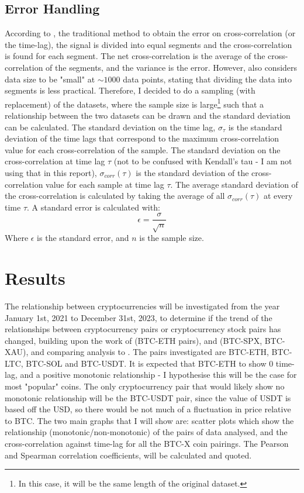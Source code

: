 \documentclass[a4paper, 10pt, conference]{ieeeconf}      %
\begin{document}
\subsection{Error Handling}
According to \cite{Misra2018}, the traditional method to obtain the error on cross-correlation (or the time-lag), the signal is divided into equal segments and the cross-correlation is found for each segment. The net cross-correlation is the average of the cross-correlation of the segments, and the variance is the error. However, \cite{Misra2018} also considers data size to be "small" at $\sim1000$ data points, stating that dividing the data into segments is less practical. Therefore, I decided to do a sampling (with replacement) of the datasets, where the sample size is large\footnote{In this case, it will be the same length of the original dataset.} such that a relationship between the two datasets can be drawn \cite{Kose2023} and the standard deviation can be calculated. The standard deviation on the time lag, $\sigma_\tau$ is the standard deviation of the time lags that correspond to the maximum cross-correlation value for each cross-correlation of the sample. The standard deviation on the cross-correlation at time lag $\tau$ (not to be confused with Kendall's tau - I am not using that in this report), $\sigma_{corr}(\tau)$ is the standard deviation of the cross-correlation value for each sample at time lag $\tau$. The average standard deviation of the cross-correlation is calculated by taking the average of all $\sigma_{corr}(\tau)$ at every time $\tau$. A standard error is calculated with:
\begin{equation}
    \epsilon = \frac{\sigma}{\sqrt{n}}
\end{equation}
Where $\epsilon$ is the standard error, and $n$ is the sample size.
\section{Results}
The relationship between cryptocurrencies will be investigated from the year January 1st, 2021 to December 31st, 2023, to determine if the trend of the relationships between cryptocurrency pairs or cryptocurrency stock pairs has changed, building upon the work of \cite{Sifat2019} (BTC-ETH pairs), and \cite{Georgoula2015} (BTC-SPX, BTC-XAU), and comparing analysis to \cite{Corbet2020contagion}. The pairs investigated are BTC-ETH, BTC-LTC, BTC-SOL and BTC-USDT. It is expected that BTC-ETH to show 0 time-lag, and a positive monotonic relationship - I hypothesise this will be the case for most "popular" coins. The only cryptocurrency pair that would likely show no monotonic relationship will be the BTC-USDT pair, since the value of USDT is based off the USD, so there would be not much of a fluctuation in price relative to BTC. The two main graphs that I will show are: scatter plots which show the relationship (monotonic/non-monotonic) of the pairs of data analysed, and the cross-correlation against time-lag for all the BTC-X coin pairings. The Pearson and Spearman correlation coefficients,  will be calculated and quoted.
\end{document}
